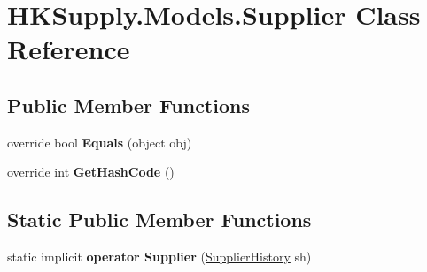 \hypertarget{class_h_k_supply_1_1_models_1_1_supplier}{}\section{H\+K\+Supply.\+Models.\+Supplier Class Reference}
\label{class_h_k_supply_1_1_models_1_1_supplier}
\subsection*{Public Member Functions}
\begin{DoxyCompactItemize}
\item 
\mbox{\label{class_h_k_supply_1_1_models_1_1_supplier_ab87f03e0a94f090e84b2bfb9224d1a35}} 
override bool {\bfseries Equals} (object obj)
\item 
\mbox{\label{class_h_k_supply_1_1_models_1_1_supplier_a78b73e8b0cdf8d483c685691f4a07e64}} 
override int {\bfseries Get\+Hash\+Code} ()
\end{DoxyCompactItemize}
\subsection*{Static Public Member Functions}
\begin{DoxyCompactItemize}
\item 
\mbox{\label{class_h_k_supply_1_1_models_1_1_supplier_a1499596c3c425278a5b4e85bc0a63cbb}} 
static implicit {\bfseries operator Supplier} (\mbox{\hyperlink{class_h_k_supply_1_1_models_1_1_supplier_history}{Supplier\+History}} sh)
\end{DoxyCompactItemize}
